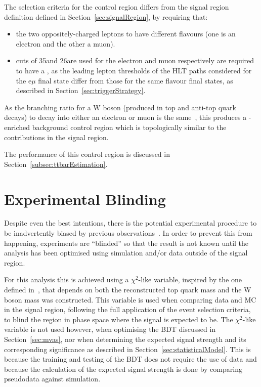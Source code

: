 The selection criteria for the \ttbar control region differs from the signal region definition defined in Section~\ref{sec:signalRegion}, by requiring that:
\begin{itemize}
\item the two oppositely-charged leptons to have different flavours (\ie one is an electron and the other a muon).
\item \pt cuts of 35\GeV and 26\GeV are used for the electron and muon respectively are required to have a , as the leading lepton \pt thresholds of the HLT paths considered for the e$\mu$ final state differ from those for the same flavour final states, as described in Section~\ref{sec:triggerStrategy}. 
\end{itemize} 

As the branching ratio for a W boson (produced in top and anti-top quark decays) to decay into either an electron or muon is the same~\cite{Tanabashi:2018oca}, this produces a \ttbar-enriched background control region which is topologically similar to the \ttbar contributions in the signal region. 

The performance of this control region is discussed in Section~\ref{subsec:ttbarEstimation}.

\section{Experimental Blinding}\label{sec:blinding}
Despite even the best intentions, there is the potential experimental procedure to be inadvertently biased by previous observations~\cite{Roodman:2003rw}.
In order to prevent this from happening, experiments are ``blinded'' so that the result is not known until the analysis has been optimised using simulation and/or data outside of the signal region.

For this analysis this is achieved using a $\chi^{2}$-like variable, inspired by the one defined in~\cite{CMS:2016tlj,TheATLAScollaboration:2016myw}, that depends on both the reconstructed top quark mass and the W boson mass was constructed.
This variable is used when comparing data and MC in the signal region, following the full application of the event selection criteria, to blind the region in phase space where the signal is expected to be.
The $\chi^{2}$-like variable is not used however, when optimising the BDT discussed in Section~\ref{sec:mvas}, nor when determining the expected signal strength and its corresponding significance as described in Section~\ref{sec:statisticalModel}.
This is because the training and testing of the BDT does not require the use of data and because the calculation of the expected signal strength is done by comparing pseudodata against simulation.

